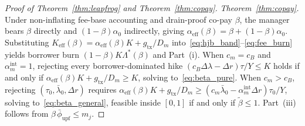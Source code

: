 \begin{proof}[Proof of Theorem~\ref{thm:leapfrog} and Theorem~\ref{thm:copay}]
\emph{Theorem~\ref{thm:copay}.} Under non-inflating fee-base accounting and drain-proof co-pay $\beta$, the manager bears $\beta$ directly and $(1 - \beta)\alpha_0$ indirectly, giving $\alpha_{\mathrm{eff}}(\beta) = \beta + (1 - \beta)\alpha_0$. Substituting $K_{\mathrm{eff}}(\beta) = \alpha_{\mathrm{eff}}(\beta)K + g_{\mathrm{tx}}/D_m$ into~\eqref{eq:hjb_band}--\eqref{eq:fee_burn} yields borrower burn $(1 - \beta)K\Lambda^*(\beta)$ and Part~(i). When $c_m = c_B$ and $\alpha_m^{\mathrm{int}} = 1$, rejecting every borrower-dominated hike $(c_B \Delta\lambda - \Delta r)\tau/Y \le K$ holds if and only if $\alpha_{\mathrm{eff}}(\beta)K + g_{\mathrm{tx}}/D_m \ge K$, solving to~\eqref{eq:beta_pure}. When $c_m > c_B$, rejecting $(\tau_0, \bar{\lambda}_0, \Delta r)$ requires $\alpha_{\mathrm{eff}}(\beta)K + g_{\mathrm{tx}}/D_m \ge (c_m \bar{\lambda}_0 - \alpha_m^{\mathrm{int}}\Delta r)\tau_0/Y$, solving to~\eqref{eq:beta_general}, feasible inside $[0, 1]$ if and only if $\tilde{\beta} \le 1$. Part~(iii) follows from $\beta\,\bar{\phi}_{\mathrm{upf}} \le m_j$.
\end{proof}
